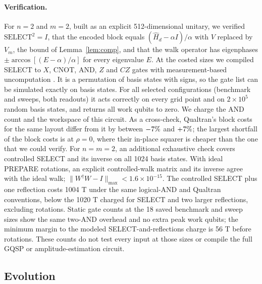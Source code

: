 \documentclass[11pt,a4paper]{article}
\theoremstyle{remark}
\newcommand{\Hd}{\hat H_d}
\begin{document}
\paragraph{Verification.} For $n=2$ and $m=2$, built as an explicit
512-dimensional unitary, we verified $\mathrm{SELECT}^2=I$, that the encoded block
equals $(\Hd-\alpha I)/\alpha$ with $V$ replaced by $V_m$, the bound of
Lemma~\ref{lem:comp}, and that the walk operator has eigenphases
$\pm\arccos[(E-\alpha)/\alpha]$ for every eigenvalue $E$. At the costed sizes we
compiled SELECT to $X$, CNOT, AND, $Z$ and $CZ$ gates with measurement-based uncomputation
\cite{gidney}. It is a permutation of basis states with signs, so the gate list can be simulated
exactly on basis states. For all \CompileCount{} selected configurations (benchmark and sweeps,
both readouts) it acts correctly on every grid point and on $2\times10^5$ random basis
states, and returns all work qubits to zero. We charge the AND count and the workspace of this circuit. As a
cross-check, Qualtran's block costs \cite{qualtran} for the same layout differ from it by between $-7\%$ and
$+7\%$; the largest shortfall of the block costs is at $\rho=0$, where their in-place squarer is cheaper than
the one that we could verify.
For $n=m=2$, an additional exhaustive check covers controlled SELECT and
its inverse on all 1024 basis states. With ideal PREPARE rotations, an
explicit controlled-walk matrix and its inverse agree with the ideal walk;
$\|W^\dagger W-I\|_{\max}<1.6\times10^{-15}$. The controlled SELECT plus
one reflection costs 1004 T under the same logical-AND and Qualtran
conventions, below the 1020 T charged for SELECT and two larger reflections,
excluding rotations. Static gate counts at the 18 saved benchmark and sweep
sizes show the same two-AND overhead and no extra peak work qubits; the
minimum margin to the modeled SELECT-and-reflections charge is 56 T before
rotations. These counts do not test every input at those sizes or compile the
full GQSP or amplitude-estimation circuit.

\subsection{Evolution}
\end{document}

